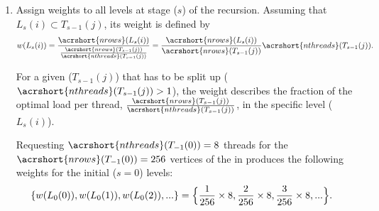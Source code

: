 \begin{enumerate}
\item Assign weights to all levels at stage ($s$) of the recursion. Assuming
  that $L_s(i) \subset T_{s-1}(j)$, its weight is defined by
	\begin{align*}
		w(L_s(i)) &=
                \frac{\acrshort{nrows}(L_s(i))}{\frac{\acrshort{nrows}(T_{s-1}(j))}{\acrshort{nthreads}(T_{s-1}(j))}}
                = \frac{\acrshort{nrows}(L_s(i))}{\acrshort{nrows}(T_{s-1}(j))}
                \acrshort{nthreads}(T_{s-1}(j)).\\
	\end{align*}
	
For a given \levelGroup ($T_{s-1}(j)$) that has to be split up
($\acrshort{nthreads}(T_{s-1}(j)) > 1$), the weight describes the fraction of
the optimal load per thread,
$\frac{\acrshort{nrows}(T_{s-1}(j))}{\acrshort{nthreads}(T_{s-1}(j))}$, in the
specific level ($L_s(i)$).

	Requesting $\acrshort{nthreads}(T_{-1}(0))=8$ threads for the $\acrshort{nrows}(T_{-1}(0)) = 256$ vertices of the \stex in  produces the following weights for the initial ($s=0$) levels:
	\begin{align*}
		\{w(L_0(0)), w(L_0(1)), w(L_0(2)), ...\} &= \Big{\{} \frac{1}{256} \times 8 , \frac{2}{256} \times 8 , \frac{3}{256} \times 8 , ...\Big{\}}.
	\end{align*}
	

\end{enumerate}
